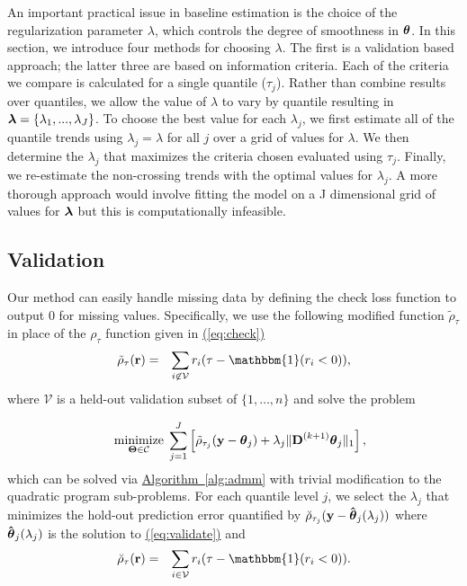 \documentclass[aoas]{imsart}
\newcommand{\Eqn}[1]{\hyperref[eq:#1]{{\rm (\ref*{eq:#1})}}} %
\newcommand{\Alg}[1]{\hyperref[alg:#1]{Algorithm~\ref*{alg:#1}}} %
\newcommand{\Eqn}[1]{{(\ref{eq:#1})}} %
\newcommand{\Alg}[1]{{Algorithm~\ref{alg:#1}}} %
\newcommand{\One}{\mathbbm{1}}
\newcommand{\V}[1]{{\bm{\mathbf{\MakeLowercase{#1}}}}} %
\newcommand{\VE}[2]{\MakeLowercase{#1}_{#2}} %
\newcommand{\Vhat}[1]{{\bm{\hat \mathbf{\MakeLowercase{#1}}}}} %
\newcommand{\M}[1]{{\bm{\mathbf{\MakeUppercase{#1}}}}} %
\newcommand{\Mn}[2]{\M{#1}^{(#2)}} %
\begin{document}
An important practical issue in baseline estimation is the choice of the regularization parameter $\lambda$, which controls the degree of smoothness in $\V{\theta}$. In this section, we introduce four methods for choosing $\lambda$. The first is a validation based approach; the latter three are based on information criteria. Each of the criteria we compare is calculated for a single quantile ($\tau_j$). Rather than combine results over quantiles, we allow the value of $\lambda$ to vary by quantile resulting in $\V{\lambda} = \{\lambda_1, ..., \lambda_J\}$. To choose the best value for each $\lambda_j$, we first estimate all of the quantile trends using $\lambda_j = \lambda$ for all $j$ over a grid of values for $\lambda$. We then determine the $\lambda_j$ that maximizes the criteria chosen evaluated using $\tau_j$. Finally, we re-estimate the non-crossing trends with the optimal values for $\lambda_j$. A more thorough approach would involve fitting the model on a J dimensional grid of values for $\V{\lambda}$ but this is computationally infeasible.      

\subsection{Validation}
Our method can easily handle missing data by defining the check loss function to output 0 for missing values. %
Specifically, we use the following modified function $\tilde{\rho}_\tau$ in place of the $\rho_\tau$ function given in \Eqn{check}
\begin{eqnarray}
\label{eq:modcheck}
\tilde{\rho}_{\tau}(\V{r}) & = & \sum_{i \not\in \mathcal{V}} \VE{r}{i}(\tau-\One(\VE{r}{i}<0)),
\end{eqnarray}
where $\mathcal{V}$ is a held-out validation subset of $\{1, \ldots, n\}$ and solve the problem

\begin{eqnarray}
\label{eq:validate}
&&\underset{\M{\Theta} \in \mathcal{C}}{\text{minimize}}\; \sum_{j=1}^J \left [\tilde{\rho}_{\tau_j}(\V{y} - \V{\theta}_{j}) +
\lambda_j \lVert \Mn{D}{k+1} \V{\theta}_j \rVert_1 \right ],
\end{eqnarray}
which can be solved via \Alg{admm} with trivial modification to the quadratic program sub-problems. For each quantile level $j$, we select the $\lambda_j$ that minimizes the hold-out prediction error quantified by $\breve{\rho}_{\tau_j}(\V{y} - \Vhat{\theta}_j(\lambda_j))$ where $\Vhat{\theta}_j(\lambda_j)$ is the solution to \Eqn{validate} and
\begin{eqnarray*}
	\breve{\rho}_{\tau}(\V{r}) & = & \sum_{i \in \mathcal{V}} \VE{r}{i}(\tau-\One(\VE{r}{i}<0)).
\end{eqnarray*}
\end{document}
